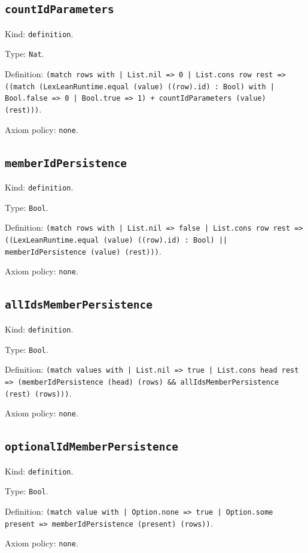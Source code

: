 \documentclass[11pt]{article}
\begin{document}
\subsection*{\texttt{countIdParameters}}
\noindent Kind: \texttt{definition}.\par
\noindent Type: \texttt{Nat}.\par
\noindent Definition: \texttt{(match rows with | List.nil => 0 | List.cons row rest => ((match (LexLeanRuntime.equal (value) ((row).id) : Bool) with | Bool.false => 0 | Bool.true => 1) + countIdParameters (value) (rest)))}.\par
\noindent Axiom policy: \texttt{none}.\par
\subsection*{\texttt{memberIdPersistence}}
\noindent Kind: \texttt{definition}.\par
\noindent Type: \texttt{Bool}.\par
\noindent Definition: \texttt{(match rows with | List.nil => false | List.cons row rest => ((LexLeanRuntime.equal (value) ((row).id) : Bool) || memberIdPersistence (value) (rest)))}.\par
\noindent Axiom policy: \texttt{none}.\par
\subsection*{\texttt{allIdsMemberPersistence}}
\noindent Kind: \texttt{definition}.\par
\noindent Type: \texttt{Bool}.\par
\noindent Definition: \texttt{(match values with | List.nil => true | List.cons head rest => (memberIdPersistence (head) (rows) \&\& allIdsMemberPersistence (rest) (rows)))}.\par
\noindent Axiom policy: \texttt{none}.\par
\subsection*{\texttt{optionalIdMemberPersistence}}
\noindent Kind: \texttt{definition}.\par
\noindent Type: \texttt{Bool}.\par
\noindent Definition: \texttt{(match value with | Option.none => true | Option.some present => memberIdPersistence (present) (rows))}.\par
\noindent Axiom policy: \texttt{none}.\par
\end{document}
